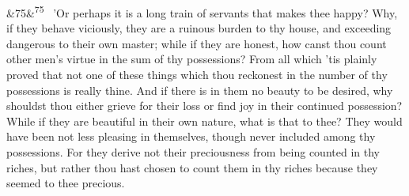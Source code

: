 \documentclass[12pt]{article}
\newcommand{\para}[1][]{\par\noindent\ifx&#1&\else\textsuperscript{\footnotesize #1}~\fi}
\begin{document}
\para[75] 'Or perhaps it is a long train of servants that makes thee happy? Why, if they behave viciously, they are a ruinous burden to thy house, and exceeding dangerous to their own master; while if they are honest, how canst thou count other men's virtue in the sum of thy possessions? From all which 'tis plainly proved that not one of these things which thou reckonest in the number of thy possessions is really thine. And if there is in them no beauty to be desired, why shouldst thou either grieve for their loss or find joy in their continued possession? While if they are beautiful in their own nature, what is that to thee? They would have been not less pleasing in themselves, though never included among thy possessions. For they derive not their preciousness from being counted in thy riches, but rather thou hast chosen to count them in thy riches because they seemed to thee precious.
\end{document}
